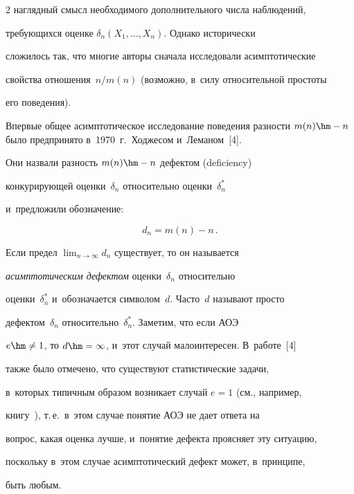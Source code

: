 \begin{multicols}{2}
наглядный смысл необходимого дополнительного числа наблюдений,


требующихся оценке $\delta_n(X_1,\ldots,X_n)$. Однако исторически


сложилось так, что многие авторы сначала исследовали асимптотические


свойства отношения~$n/m(n)$ (возможно, в~силу относительной простоты


его поведения).





Впервые общее асимптотическое исследование поведения разности $m(n)


\hm- n$ было предпринято в~1970~г.\ Ходжесом и~Леманом~[4]. 


Они назвали разность $m(n) \hm- n$ дефектом (deficiency)


конкурирующей оценки~$\delta_n$ относительно оценки~$\delta^*_n$ 


и~предложили обозначение:


\begin{equation}


d_n = m(n) - n\,.


\label{e1.1}


\end{equation}


Если предел $\lim_{n\to\infty} d_n$ существует, то он называется


\textit{асимптотическим дефектом} оценки~$\delta_n$ относительно 


оценки~$\delta^*_n$ и~обозначается символом~$d$. Часто~$d$ называют просто


дефектом~$\delta_n$ относительно~$\delta_n^*$. Заметим, что если АОЭ


$e\hm \ne 1$, то $d\hm = \infty$, и~этот случай малоинтересен. В~работе~[4] 


также было отмечено, что существуют статистические задачи, 


в~которых типичным образом возникает случай $e = 1$ (см., например,


книгу~\cite{5-ben}), т.\,е.\ в~этом случае понятие АОЭ не дает ответа на


вопрос, какая оценка лучше, и~понятие дефекта проясняет эту ситуацию,


поскольку в~этом случае асимптотический дефект может, в~принципе,


быть любым.






\end{multicols}
